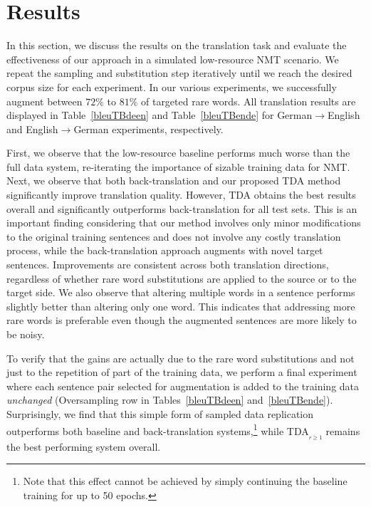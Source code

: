\section{Results} \label{tda:results}

In this section, we discuss the results on the translation task and evaluate the effectiveness of our approach in a simulated low-resource NMT scenario.
We repeat the sampling and substitution step iteratively until we reach the desired corpus size for each experiment. 
In our various experiments, we successfully augment between $72\%$ to $81\%$ of targeted rare words. 
All translation results are displayed in Table~\ref{bleuTBdeen} and Table~\ref{bleuTBende} for German$\rightarrow$English and English$\rightarrow$German experiments, respectively. 

First, we observe that the low-resource baseline performs much worse than the full data system,
re-iterating the importance of sizable training data for NMT. %
Next, we observe that both back-translation and our proposed TDA method significantly improve translation quality. However, TDA obtains the best results overall and significantly outperforms back-translation for all test sets. %
This is an important finding considering that our method involves only minor modifications to the original training sentences and does not involve any costly translation process, while the back-translation approach augments with novel target sentences.
%
Improvements are consistent across both translation directions, %
regardless of whether rare word substitutions are applied to the source or to the target side.
We also observe that altering multiple words in a sentence performs slightly better than altering only one word.
This indicates that addressing more rare words is preferable even though the augmented sentences are more likely to be noisy.  

To verify that the gains are actually due to the rare word substitutions and not just to the repetition of part of the training data, we perform a final experiment where each sentence pair selected for augmentation is added to the training data \textit{unchanged} (Oversampling row in Tables~\ref{bleuTBdeen} and~\ref{bleuTBende}). 
Surprisingly, we find that this simple form of sampled data replication outperforms both baseline and back-translation systems,\footnote{Note that this effect cannot be achieved by simply continuing the baseline training for up to 50 epochs.} while TDA\textsubscript{$_{r\ge 1}$} remains the best performing system overall.

